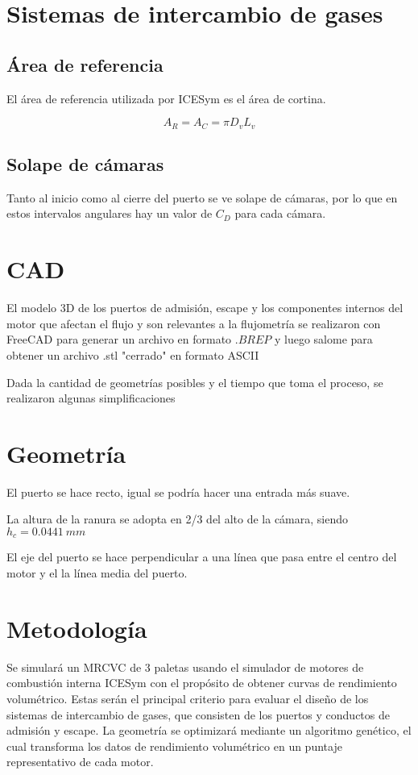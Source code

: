 \section{Sistemas de intercambio de gases}
%
\subsection{Área de referencia}
%
El área de referencia utilizada por ICESym es el área de cortina.

$$ A_R = A_C = \pi D_v L_v $$

\subsection{Solape de cámaras}
%
Tanto al inicio como al cierre del puerto se ve solape de cámaras, por lo que
en estos intervalos angulares hay un valor de $C_D$ para cada cámara.

\section{CAD}
%
El modelo 3D de los puertos de admisión, escape y los componentes internos del
motor que afectan el flujo y son relevantes a la flujometría se realizaron con
FreeCAD\cite{freecad} para generar un archivo en formato $.BREP$ y luego
salome\cite{salome} para obtener un archivo .stl "cerrado" en formato ASCII

Dada la cantidad de geometrías posibles y el tiempo que toma el proceso, se
realizaron algunas simplificaciones

\section{Geometría}
%
El puerto se hace recto, igual se podría hacer una entrada más suave.

La altura de la ranura se adopta en 2/3 del alto de la cámara, siendo $h_c=0.0441\ mm$

El eje del puerto se hace perpendicular a una línea que pasa entre el centro
del motor y el la línea media del puerto.


\section{Metodología}
%
Se simulará un MRCVC de 3 paletas usando el simulador de motores de combustión
interna ICESym \cite{icesym} con el propósito de obtener curvas de rendimiento
volumétrico.
%
Estas serán el principal criterio para evaluar el diseño de los sistemas de
intercambio de gases, que consisten de los puertos y conductos de admisión y
escape.
%
La geometría se optimizará mediante un algoritmo genético, el cual transforma
los datos de rendimiento volumétrico en un puntaje representativo de cada
motor.


